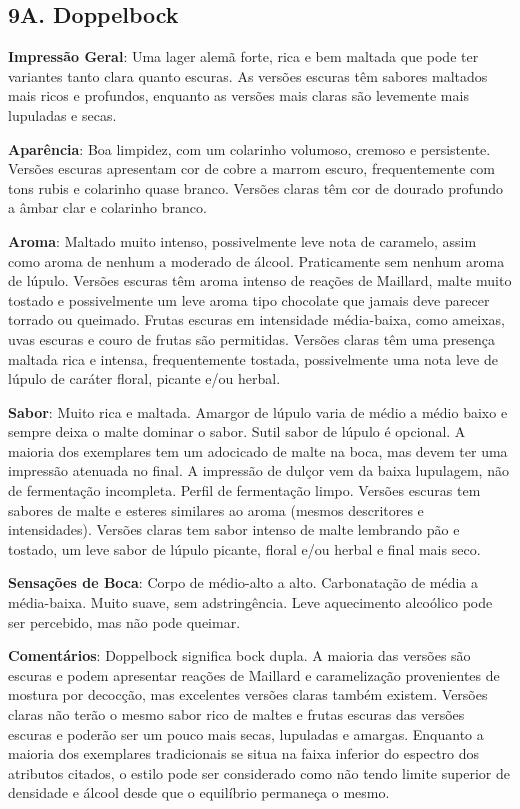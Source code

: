 \subsection*{9A. Doppelbock}
\textbf{Impressão Geral}: Uma lager alemã forte, rica e bem maltada que pode ter variantes tanto clara quanto escuras. As versões escuras têm sabores maltados mais ricos e profundos, enquanto as versões mais claras são levemente mais lupuladas e secas.

\textbf{Aparência}: Boa limpidez, com um colarinho volumoso, cremoso e persistente. Versões escuras apresentam cor de cobre a marrom escuro, frequentemente com tons rubis e colarinho quase branco. Versões claras têm cor de dourado profundo a âmbar clar e colarinho branco.

\textbf{Aroma}: Maltado muito intenso, possivelmente leve nota de caramelo, assim como aroma de nenhum a moderado de álcool. Praticamente sem nenhum aroma de lúpulo. Versões escuras têm aroma intenso de reações de Maillard, malte muito tostado e possivelmente um leve aroma tipo chocolate que jamais deve parecer torrado ou queimado. Frutas escuras em intensidade média-baixa, como ameixas, uvas escuras e couro de frutas são permitidas. Versões claras têm uma presença maltada rica e intensa, frequentemente tostada, possivelmente uma nota leve de lúpulo de caráter floral, picante e/ou herbal.

\textbf{Sabor}: Muito rica e maltada. Amargor de lúpulo varia de médio a médio baixo e sempre deixa o malte dominar o sabor. Sutil sabor de lúpulo é opcional. A maioria dos exemplares tem um adocicado de malte na boca, mas devem ter uma impressão atenuada no final. A impressão de dulçor vem da baixa lupulagem, não de fermentação incompleta. Perfil de fermentação limpo. Versões escuras tem sabores de malte e esteres similares ao aroma (mesmos descritores e intensidades). Versões claras tem sabor intenso de malte lembrando pão e tostado, um leve sabor de lúpulo picante, floral e/ou herbal e final mais seco.

\textbf{Sensações de Boca}: Corpo de médio-alto a alto. Carbonatação de média a média-baixa. Muito suave, sem adstringência. Leve aquecimento alcoólico pode ser percebido, mas não pode queimar.

\textbf{Comentários}: Doppelbock significa bock dupla. A maioria das versões são escuras e podem apresentar reações de Maillard e caramelização provenientes de mostura por decocção, mas excelentes versões claras também existem. Versões claras não terão o mesmo sabor rico de maltes e frutas escuras das versões escuras e poderão ser um pouco mais secas, lupuladas e amargas. Enquanto a maioria dos exemplares tradicionais se situa na faixa inferior do espectro dos atributos citados, o estilo pode ser considerado como não tendo limite superior de densidade e álcool desde que o equilíbrio permaneça o mesmo.

